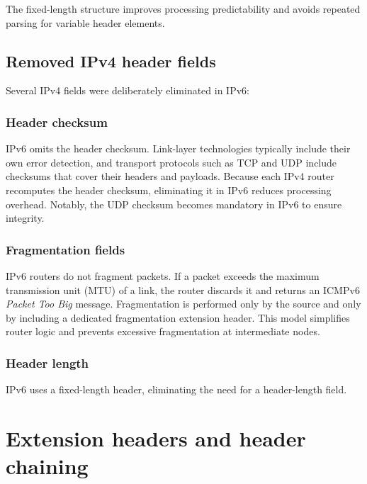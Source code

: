 The fixed-length structure improves processing predictability and avoids repeated parsing for variable header elements.

\begin{center}
\end{center}

\subsection{Removed IPv4 header fields}

Several IPv4 fields were deliberately eliminated in IPv6:

\subsubsection*{Header checksum}

IPv6 omits the header checksum. Link-layer technologies typically include their own error detection, and transport protocols such as TCP and UDP include checksums that cover their headers and payloads. Because each IPv4 router recomputes the header checksum, eliminating it in IPv6 reduces processing overhead. Notably, the UDP checksum becomes mandatory in IPv6 to ensure integrity.

\subsubsection*{Fragmentation fields}

IPv6 routers do not fragment packets. If a packet exceeds the maximum transmission unit (MTU) of a link, the router discards it and returns an ICMPv6 \emph{Packet Too Big} message. Fragmentation is performed only by the source and only by including a dedicated fragmentation extension header. This model simplifies router logic and prevents excessive fragmentation at intermediate nodes.

\subsubsection*{Header length}

IPv6 uses a fixed-length header, eliminating the need for a header-length field.

\section{Extension headers and header chaining}

